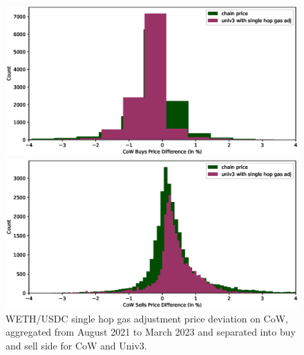 \documentclass[a4paper,10pt]{article}
\theoremstyle{remark}
\begin{document}
\begin{figure}
  \begin{center}
    \begin{minipage}{.5\textwidth}
      \begin{center}
        \includegraphics[width=.9\textwidth]
          {diagrams/weth_buy_hist.eps}
      \end{center}
   \end{minipage}%
    \begin{minipage}{.5\textwidth}
      \begin{center}
        \includegraphics[width=.9\textwidth]
          {diagrams/weth_sell_hist.eps}
      \end{center}
    \end{minipage}
  \end{center}
  \caption{WETH/USDC single hop gas adjustment price deviation on CoW, aggregated from August 2021 to March 2023 and separated into buy and sell side for CoW and Univ3.}
\end{figure}
\end{document}
